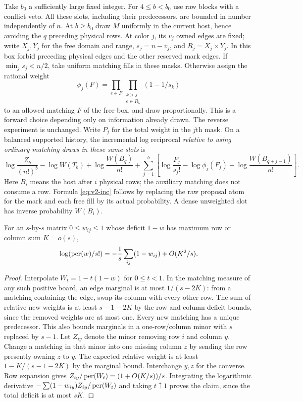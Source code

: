 Take $b_0$ a sufficiently large fixed integer. For $4\le b<b_0$ use raw
blocks with a conflict veto. All these slots, including their predecessors,
are bounded in number independently of $n$. At $b\ge b_0$ draw $M$
uniformly in the current host, hence avoiding the $q$ preceding physical
rows. At color $j$, its $v_j$ owned edges are fixed; write $X_j,Y_j$
for the free domain and range, $s_j=n-v_j$, and $R_j=X_j\times Y_j$.
In this box forbid preceding physical edges and the other reserved mark
edges. If $\min_j s_j<n/2$, take uniform matching fills in these masks.
Otherwise assign the rational weight
\[
 \phi_j(F)=\prod_{e\in F}\prod_{\substack{k>j\\ e\in R_k}}(1-1/s_k)
\]
to an allowed matching $F$ of the free box, and draw proportionally.
This is a forward choice depending only on information already drawn.
The reverse experiment is unchanged. Write $P_j$ for the total weight in
the $j$th mask. On a balanced supported history, the incremental log
reciprocal \emph{relative to using ordinary matching draws in these same
slots} is
\begin{equation}\label{eq:v2-inc}
 \log\frac{Z_b}{(n!)^b}-\log W(T_b)
 +\log\frac{W(B_q)}{n!}
 +\sum_{j=1}^b\left[
     \log\frac{P_j}{s_j!}-\log\phi_j(F_j)
                         -\log\frac{W(B_{q+j-1})}{n!}\right].
\end{equation}
Here $B_i$ means the host after $i$ physical rows; the auxiliary matching
does not consume a row. Formula \eqref{eq:v2-inc} follows by replacing
the raw proposal atom for the mark and each free fill by its actual
probability. A dense unweighted slot has inverse probability $W(B_i)$.

\begin{lemma}\label{lem:v2-weighted-dense}
For an $s$-by-$s$ matrix $0\le w_{ij}\le1$ whose deficit $1-w$ has
maximum row or column sum $K=o(s)$,
\[
 \log(\operatorname{per}(w)/s!)=-\frac1s\sum_{ij}(1-w_{ij})+O(K^2/s).
\]
\end{lemma}
\begin{proof}
Interpolate $W_t=1-t(1-w)$ for $0\le t<1$. In the matching measure of
any such positive board, an edge marginal is at most $1/(s-2K)$:
from a matching containing the edge, swap its column with every other
row. The sum of relative new weights is at least $s-1-2K$ by the
row and column deficit bounds, since the removed weights are at most
one. Every new matching has a unique predecessor. This also bounds
marginals in a one-row/column minor with $s$ replaced by $s-1$.
Let $Z_{iy}$ denote the minor removing row $i$ and column $y$.
Change a matching in that minor into one missing column $z$ by sending
the row presently owning $z$ to $y$. The expected relative weight is
at least $1-K/(s-1-2K)$ by the marginal bound. Interchange $y,z$ for
the converse. Row expansion gives
$Z_{iy}/\operatorname{per}(W_t)=(1+O(K/s))/s$. Integrating the logarithmic derivative
$-\sum(1-w_{iy})Z_{iy}/\operatorname{per}(W_t)$ and taking $t\uparrow1$ proves the
claim, since the total deficit is at most $sK$.
\end{proof}


